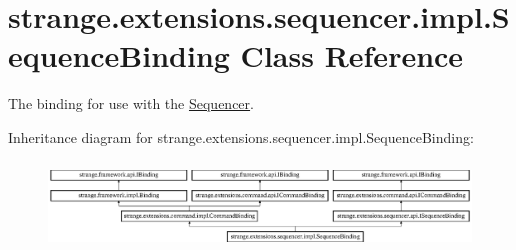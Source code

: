 \hypertarget{classstrange_1_1extensions_1_1sequencer_1_1impl_1_1_sequence_binding}{\section{strange.\-extensions.\-sequencer.\-impl.\-Sequence\-Binding Class Reference}
\label{classstrange_1_1extensions_1_1sequencer_1_1impl_1_1_sequence_binding}
}


The binding for use with the \hyperlink{classstrange_1_1extensions_1_1sequencer_1_1impl_1_1_sequencer}{Sequencer}.  


Inheritance diagram for strange.\-extensions.\-sequencer.\-impl.\-Sequence\-Binding\-:\begin{figure}[H]
\begin{center}
\leavevmode
\includegraphics[height=2.362869cm]{classstrange_1_1extensions_1_1sequencer_1_1impl_1_1_sequence_binding}
\end{center}
\end{figure}
